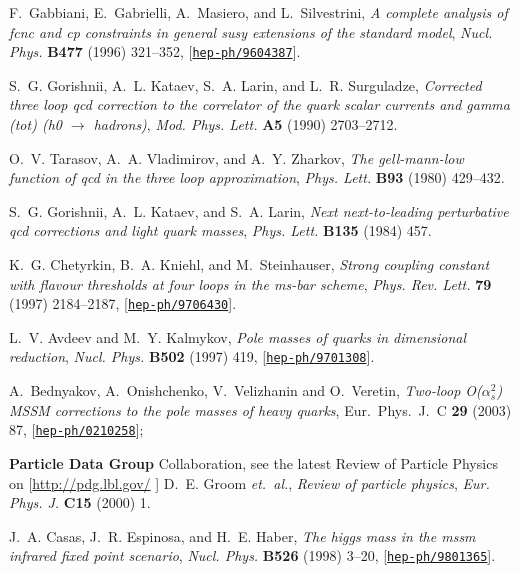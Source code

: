 \documentclass[]{article}
\begin{document}
\begin{thebibliography}{10}
F.~Gabbiani, E.~Gabrielli, A.~Masiero, and L.~Silvestrini, {\it A complete
  analysis of fcnc and cp constraints in general susy extensions of the
  standard model},  {\em Nucl. Phys.} {\bf B477} (1996) 321--352,
  [\href{http://xxx.lanl.gov/abs/hep-ph/9604387}{{\tt hep-ph/9604387}}].

S.~G. Gorishnii, A.~L. Kataev, S.~A. Larin, and L.~R. Surguladze, {\it
  Corrected three loop qcd correction to the correlator of the quark scalar
  currents and gamma (tot) (h0 $\to$ hadrons)},  {\em Mod. Phys. Lett.} {\bf
  A5} (1990) 2703--2712.

O.~V. Tarasov, A.~A. Vladimirov, and A.~Y. Zharkov, {\it The gell-mann-low
  function of qcd in the three loop approximation},  {\em Phys. Lett.} {\bf
  B93} (1980) 429--432.

S.~G. Gorishnii, A.~L. Kataev, and S.~A. Larin, {\it Next next-to-leading
  perturbative qcd corrections and light quark masses},  {\em Phys. Lett.} {\bf
  B135} (1984) 457.

K.~G. Chetyrkin, B.~A. Kniehl, and M.~Steinhauser, {\it Strong coupling
  constant with flavour thresholds at four loops in the ms-bar scheme},  {\em
  Phys. Rev. Lett.} {\bf 79} (1997) 2184--2187,
  [\href{http://xxx.lanl.gov/abs/hep-ph/9706430}{{\tt hep-ph/9706430}}].

L.~V. Avdeev and M.~Y. Kalmykov, {\it Pole masses of quarks in dimensional
  reduction}, {\em Nucl. Phys. } {\bf B502} (1997) 419,
  [\href{http://xxx.lanl.gov/abs/hep-ph/9701308}{{\tt hep-ph/9701308}}].

A.~Bednyakov, A.~Onishchenko, V.~Velizhanin and O.~Veretin,
{\it Two-loop O($\alpha_s^2$) MSSM corrections to the pole masses of heavy
  quarks}, Eur.\ Phys.\ J.\ C {\bf 29} (2003) 87,
  [\href{http://xxx.lanl.gov/abs/hep-ph/0210258}{{\tt hep-ph/0210258}}];

{\bf Particle Data Group} Collaboration, 
see the latest Review of Particle Physics on 
  [\href{http://pdg.lbl.gov/}{http://pdg.lbl.gov/}
]
D.~E. Groom {\em et.~al.}, {\it Review
  of particle physics},  {\em Eur. Phys. J.} {\bf C15} (2000) 1.

J.~A. Casas, J.~R. Espinosa, and H.~E. Haber, {\it The higgs mass in the mssm
  infrared fixed point scenario},  {\em Nucl. Phys.} {\bf B526} (1998) 3--20,
  [\href{http://xxx.lanl.gov/abs/hep-ph/9801365}{{\tt hep-ph/9801365}}].


\end{thebibliography}
\end{document}
